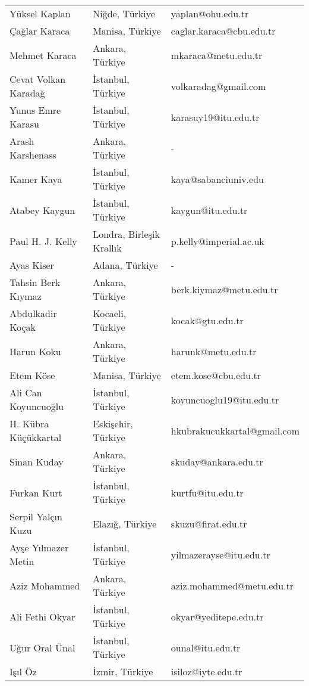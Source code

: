 {\begin{longtable}[c]{@{}lll@{}}
Yüksel Kaplan & Niğde, Türkiye & yaplan@ohu.edu.tr \\
\rowcolor[HTML]{C0C0C0} 
Çağlar Karaca & Manisa, Türkiye & caglar.karaca@cbu.edu.tr \\
Mehmet Karaca & Ankara, Türkiye & mkaraca@metu.edu.tr \\
\rowcolor[HTML]{C0C0C0} 
Cevat Volkan Karadağ & İstanbul, Türkiye & volkaradag@gmail.com \\
Yunus Emre Karasu & İstanbul, Türkiye & karasuy19@itu.edu.tr \\
\rowcolor[HTML]{C0C0C0} 
Arash Karshenass & Ankara, Türkiye & - \\
Kamer Kaya & İstanbul, Türkiye & kaya@sabanciuniv.edu \\
\rowcolor[HTML]{C0C0C0} 
Atabey Kaygun & İstanbul, Türkiye & kaygun@itu.edu.tr \\
Paul H. J. Kelly & Londra, Birleşik Krallık & p.kelly@imperial.ac.uk \\
\rowcolor[HTML]{C0C0C0} 
Ayas Kiser & Adana, Türkiye & - \\
Tahsin Berk Kıymaz & Ankara, Türkiye & berk.kiymaz@metu.edu.tr \\
\rowcolor[HTML]{C0C0C0} 
Abdulkadir Koçak & Kocaeli, Türkiye & kocak@gtu.edu.tr \\
Harun Koku & Ankara, Türkiye & harunk@metu.edu.tr \\
\rowcolor[HTML]{C0C0C0} 
Etem Köse & Manisa, Türkiye & etem.kose@cbu.edu.tr \\
Ali Can Koyuncuoğlu & İstanbul, Türkiye & koyuncuoglu19@itu.edu.tr \\
\rowcolor[HTML]{C0C0C0} 
H. Kübra Küçükkartal & Eskişehir, Türkiye & hkubrakucukkartal@gmail.com \\
Sinan Kuday & Ankara, Türkiye & skuday@ankara.edu.tr \\
\rowcolor[HTML]{C0C0C0} 
Furkan Kurt & İstanbul, Türkiye & kurtfu@itu.edu.tr \\
Serpil Yalçın Kuzu & Elazığ, Türkiye & skuzu@firat.edu.tr \\
\rowcolor[HTML]{C0C0C0} 
Ayşe Yılmazer Metin & İstanbul, Türkiye & yilmazerayse@itu.edu.tr \\
Aziz Mohammed & Ankara, Türkiye & aziz.mohammed@metu.edu.tr \\
\rowcolor[HTML]{C0C0C0} 
Ali Fethi Okyar & İstanbul, Türkiye & okyar@yeditepe.edu.tr \\
Uğur Oral Ünal & İstanbul, Türkiye & ounal@itu.edu.tr \\
\rowcolor[HTML]{C0C0C0} 
Işıl Öz & İzmir, Türkiye & isiloz@iyte.edu.tr \\

\end{longtable}}

